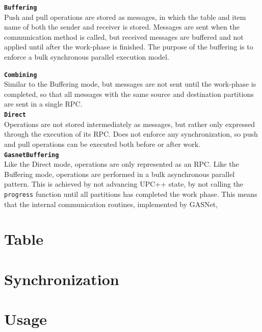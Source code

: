 \documentclass{uit-report}
\begin{document}
\hspace{4ex} \textbf{\texttt{Buffering}}
\\
Push and pull operations are stored as messages, in which the table and item name of both the sender and receiver is stored. Messages are sent when the communication method is called, but received messages are buffered and not applied until after the work-phase is finished. The purpose of the buffering is to enforce a bulk synchronous parallel execution model.

\hspace{4ex} \textbf{\texttt{Combining}}
\\
Similar to the Buffering mode, but messages are not sent until the work-phase is completed, so that all messages with the same source and destination partitions are sent in a single RPC. \\

\hspace{4ex} \textbf{\texttt{Direct}}
\\
Operations are not stored intermediately as messages, but rather only expressed through the execution of its RPC. Does not enforce any synchronization, so push and pull operations can be executed both before or after work. \\

\hspace{4ex} \textbf{\texttt{GasnetBuffering}}
\\
Like the Direct mode, operations are only represented as an RPC. Like the Buffering mode, operations are performed in a bulk asynchronous parallel pattern. This is achieved by not advancing UPC++ state, by not calling the \texttt{progress} function until all partitions has completed the work phase. This means that the internal communication routines, implemented by GASNet, 


\section{Table}


\section{Synchronization}
\section{Usage}
\end{document}
